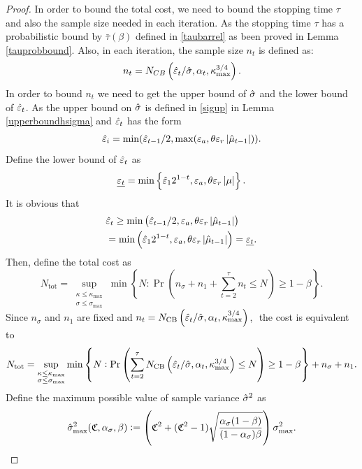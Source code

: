 \documentclass{iitthesis}
\theoremstyle{definition}
\begin{document}
\begin{proof}
 In order to bound the total cost, we need to bound the stopping time $\tau$ and also the sample size needed in each iteration. As the stopping time $\tau$ has a probabilistic bound by $\bar{\tau}(\beta)$ defined in \eqref{taubarrel} as been proved in Lemma \ref{tauprobbound}.  Also, in each iteration, the sample size $n_t$ is defined as:
$$n_t = N_{CB}\left(\hat{\varepsilon}_t/\hat{\sigma},\alpha_t,\kappa_{\max}^{3/4}\right).$$
In order to bound $n_t$ we need to get the upper bound of $\hat{\sigma}$ and the lower bound of $\hat{\varepsilon}_t$. As the upper bound on $\hat{\sigma}$ is defined in \eqref{sigup} in Lemma \ref{upperboundhsigma} and $\hat{\varepsilon}_t$ has the form
\begin{align}
\hat{\varepsilon}_i= \min(\hat{\varepsilon}_{t-1}/2, \max(\varepsilon_a,\theta\varepsilon_r\left \lvert \hat{\mu}_{t-1} \right \rvert)).
\end{align}
Define the lower bound of $\hat{\varepsilon}_t$ as
\begin{align*}
  \underline{\varepsilon_t} = \min \left \{ \hat{\varepsilon}_12^{1-t},\varepsilon_a, \theta\varepsilon_r\left \lvert \mu \right \rvert \right \}.
\end{align*}
It is obvious that
\begin{align*}
&\hat{\varepsilon}_t \geq  \min\left(\hat{\varepsilon}_{t-1}/2, \varepsilon_a, \theta\varepsilon_r\left \lvert \hat{\mu}_{t-1} \right \rvert\right)\\
& = \min\left(\hat{\varepsilon}_12^{1-t}, \varepsilon_a, \theta\varepsilon_r\left \lvert \hat{\mu}_{t-1} \right \rvert\right) =   \underline{\varepsilon_t} .\\
\end{align*}
Then, define the total cost as
\begin{equation*}
N_{\text{tot}} = \sup_{\substack{\kappa \le \kappa_{\max} \\ \sigma \le \sigma_{\max}}} \min\left\{N : \Pr\left(n_{\sigma} + n_1+\sum_{t=2}^\tau n_t \le N\right) \ge 1-\beta  \right \}.
\end{equation*}
Since $n_\sigma$ and $n_1$ are fixed and $n_t =  N_{\text{CB}}\left(\hat{\varepsilon}_t/\hat{\sigma},\alpha_t,\kappa_{\max}^{3/4}\right)$, $ $ the cost is equivalent to 
\begin{equation*}
N_{\text{tot}} = \sup_{\substack{\kappa \le \kappa_{\max} \\ \sigma \le \sigma_{\max}}} \min\left\{N : \Pr\left(\sum_{t=2}^\tau N_{\text{CB}}\left(\hat{\varepsilon}_t/\hat{\sigma},\alpha_t,\kappa_{\max}^{3/4}\right) \le N\right) \ge 1-\beta  \right \}+n_{\sigma} + n_1.
\end{equation*}
Define the maximum possible value of sample variance $\hat{\sigma}^2$ as
\begin{align}\label{sigmax}
\hsigma_{\max}^2 (\fudge, \alpha_{\sigma},\beta) := \left(\fudge^2+(\fudge^2-1)\sqrt{\frac{\alpha_{\sigma}(1-\beta)}{(1-\alpha_{\sigma})\beta}}\right)\sigma_{\max}^2.

\end{align}
\end{proof}
\end{document}
